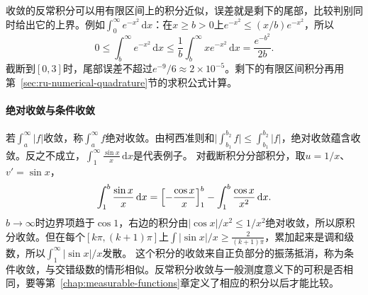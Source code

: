 收敛的反常积分可以用有限区间上的积分近似，误差就是剩下的尾部，比较判别同时给出它的上界。例如$\int_0^\infty e^{-x^2}\,\mathrm dx$：在$x\geq b>0$上$e^{-x^2}\leq(x/b)e^{-x^2}$，所以
\[
 0\leq\int_b^\infty e^{-x^2}\,\mathrm dx\leq\frac1b\int_b^\infty xe^{-x^2}\,\mathrm dx=\frac{e^{-b^2}}{2b}.
\]
截断到$[0,3]$时，尾部误差不超过$e^{-9}/6\approx2\times10^{-5}$。剩下的有限区间积分再用第~\ref{sec:ru-numerical-quadrature}节的求积公式计算。

\paragraph{绝对收敛与条件收敛}
若$\int_a^\infty|f|$收敛，称$\int_a^\infty f$绝对收敛。由柯西准则和$\bigl|\int_{b_1}^{b_2}f\bigr|\leq\int_{b_1}^{b_2}|f|$，绝对收敛蕴含收敛。反之不成立，$\int_1^\infty\frac{\sin x}x\,\mathrm dx$是代表例子。
对截断积分分部积分，取$u=1/x$、$v'=\sin x$，
\[
 \int_1^b\frac{\sin x}x\,\mathrm dx=\Bigl[-\frac{\cos x}x\Bigr]_1^b-\int_1^b\frac{\cos x}{x^2}\,\mathrm dx.
\]
$b\to\infty$时边界项趋于$\cos1$，右边的积分由$|\cos x|/x^2\leq1/x^2$绝对收敛，所以原积分收敛。但在每个$[k\pi,(k+1)\pi]$上$\int|\sin x|/x\geq\frac2{(k+1)\pi}$，累加起来是调和级数，所以$\int_1^\infty|\sin x|/x$发散。
这个积分的收敛来自正负部分的振荡抵消，称为条件收敛，与交错级数的情形相似。反常积分收敛与一般测度意义下的可积是否相同，要等第~\ref{chap:measurable-functions}章定义了相应的积分以后才能比较。
